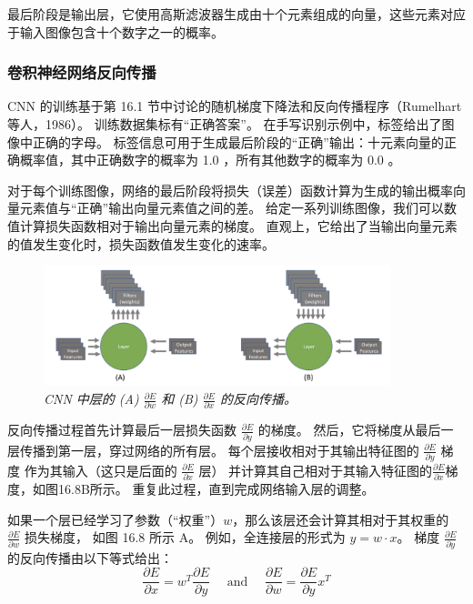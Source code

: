 最后阶段是输出层，它使用高斯滤波器生成由十个元素组成的向量，这些元素对应于输入图像包含十个数字之一的概率。

\subsubsection{卷积神经网络反向传播}
CNN 的训练基于第 16.1 节中讨论的随机梯度下降法和反向传播程序（Rumelhart 等人，1986）。 训练数据集标有“正确答案”。 
在手写识别示例中，标签给出了图像中正确的字母。 
标签信息可用于生成最后阶段的“正确”输出：十元素向量的正确概率值，其中正确数字的概率为 1.0 ，所有其他数字的概率为 0.0 。

对于每个训练图像，网络的最后阶段将损失（误差）函数计算为生成的输出概率向量元素值与“正确”输出向量元素值之间的差。 
给定一系列训练图像，我们可以数值计算损失函数相对于输出向量元素的梯度。 
直观上，它给出了当输出向量元素的值发生变化时，损失函数值发生变化的速率。

\begin{figure}[H]
	\centering
	\includegraphics[width=0.9\textwidth]{figs/F16.8.png}
	\caption{\textit{CNN 中层的 (A) $\frac{\partial E}{\partial w}$ 
	和 (B) $\frac{\partial E}{\partial x}$ 的反向传播。}}
\end{figure}

反向传播过程首先计算最后一层损失函数 $\frac{\partial E}{\partial y}$ 的梯度。 
然后，它将梯度从最后一层传播到第一层，穿过网络的所有层。 
每个层接收相对于其输出特征图的 $\frac{\partial E}{\partial y}$ 梯度
作为其输入（这只是后面的 $\frac{\partial E}{\partial x}$ 层）
并计算其自己相对于其输入特征图的$\frac{\partial E}{\partial x}$梯度，如图16.8B所示。 
重复此过程，直到完成网络输入层的调整。

如果一个层已经学习了参数（“权重”）$w$，那么该层还会计算其相对于其权重的 $\frac{\partial E}{\partial w}$ 损失梯度，
如图 16.8 所示 A。 例如，全连接层的形式为 $y=w \cdot x$。 
梯度 $\frac{\partial E}{\partial y}$ 的反向传播由以下等式给出：
$$
\frac{\partial E}{\partial x}=w^{T} \frac{\partial E}{\partial y} \quad \text { and } \quad \frac{\partial E}{\partial w}=\frac{\partial E}{\partial y} x^{T}
$$

